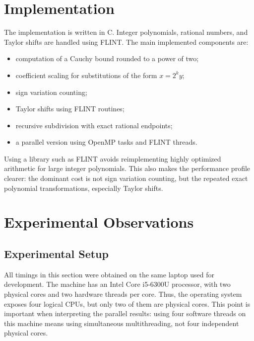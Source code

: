 \documentclass[letterpaper]{article}
\begin{document}
\section{Implementation}

The implementation is written in C. Integer polynomials, rational numbers, and
Taylor shifts are handled using FLINT. The main implemented components are:
\begin{itemize}
  \item computation of a Cauchy bound rounded to a power of two;
  \item coefficient scaling for substitutions of the form $x=2^k y$;
  \item sign variation counting;
  \item Taylor shifts using FLINT routines;
  \item recursive subdivision with exact rational endpoints;
  \item a parallel version using OpenMP tasks and FLINT threads.
\end{itemize}

Using a library such as FLINT avoids reimplementing highly optimized arithmetic
for large integer polynomials. This also makes the performance profile clearer:
the dominant cost is not sign variation counting, but the repeated exact
polynomial transformations, especially Taylor shifts.

\section{Experimental Observations}

\subsection{Experimental Setup}

All timings in this section were obtained on the same laptop used for
development. The machine has an Intel Core i5-6300U processor, with two
physical cores and two hardware threads per core. Thus, the operating system
exposes four logical CPUs, but only two of them are physical cores. This point
is important when interpreting the parallel results: using four software
threads on this machine means using simultaneous multithreading, not four
independent physical cores.
\end{document}
